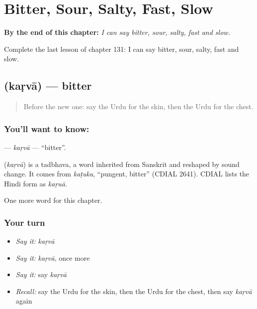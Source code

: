 
\chapter{Bitter, Sour, Salty, Fast, Slow}
\label{ch:ur-bitter-sour-salty-fast-slow}

\begin{chapteropening}
\textbf{By the end of this chapter:} \emph{I can say bitter, sour, salty, fast and slow.}

Complete the last lesson of chapter 131: I can say bitter, sour, salty, fast and slow.
\end{chapteropening}

\section[\texorpdfstring{\ur{کڑوا} (kaṛvā)}{کڑوا (kaṛvā)}]{ (kaṛvā) — bitter}

\label{lesson:UR-C131-karva}



\begin{quote}
Before the new one: say the Urdu for the skin, then the Urdu for the chest.
\end{quote}

\subsection*{You'll want to know: }
\textbf{} — \emph{kaṛvā} — \textquotedblleft{}bitter\textquotedblright{}.

\begin{cousinweb}
\textbf{} (\emph{kaṛvā}) is a tadbhava, a word inherited from Sanskrit and reshaped by sound change. It comes from \emph{kaṭuka}, \textquotedblleft{}pungent, bitter\textquotedblright{} (CDIAL 2641). CDIAL lists the Hindi form as \emph{kaṛuā}.
\end{cousinweb}

\begin{grammarlens}[title={What you've built}]
One more word for this chapter.
\end{grammarlens}

\subsection*{Your turn}
\begin{itemize}
\raggedright
  \item \emph{Say it:} \emph{kaṛvā}
  \item \emph{Say it:} \emph{kaṛvā}, once more
  \item \emph{Say it:} say \emph{kaṛvā}
  \item \emph{Recall:} say the Urdu for the skin, then the Urdu for the chest, then say \emph{kaṛvā} again
\end{itemize}

